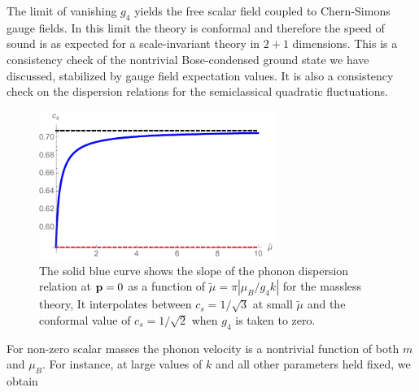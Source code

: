 \eea
The limit of vanishing $g_4$ yields the free scalar field coupled to Chern-Simons gauge fields. In this limit the theory is conformal and therefore the speed of sound is as expected for a scale-invariant theory in $2+1$ dimensions. This is a consistency check of  the nontrivial Bose-condensed ground state we have discussed, stabilized by gauge field expectation values. It is also a consistency check on the dispersion relations for the semiclassical quadratic fluctuations.
\begin{figure}[h]
\begin{center}
\includegraphics[width=3in]{Chapter_3_Folder_1806.06976/figures/soundspeed.pdf}
\end{center}
    \caption[This figure shows the value of the speed of sound as a function of the dimensionless parameter $\tilde{\mu}= \pi \left|\frac{\mu_B}{g_4 k} \right|$ for the massless theory.]{ The solid blue curve shows the slope of the phonon dispersion relation at ${\bf p} =0$ as a function of $\tilde\mu = \pi|\mu_B/g_4 k|$ for the massless theory, It interpolates between $c_s=1/\sqrt{3}$ at small $\tilde\mu$ and the conformal value of $c_s = 1/\sqrt{2}$ when $g_4$ is taken to zero.
}
\end{figure}
For non-zero scalar masses the phonon velocity is a nontrivial function of both $m$ and $\mu_B$.  For instance, at large values of $k$ and all other parameters held fixed, we obtain
